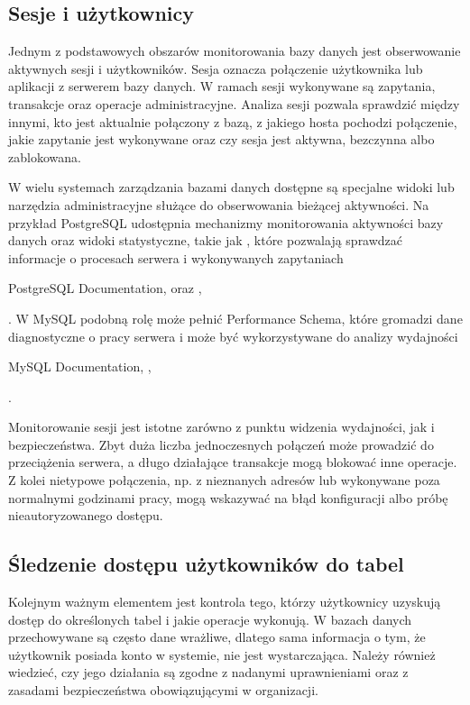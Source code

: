 \documentclass[letterpaper,10pt,polish]{sphinxmanual}
\begin{document}
\subsection{Sesje i użytkownicy}
\label{\detokenize{rozdzia_u0142_2/rozdzia_u0142_24/index:sesje-i-uzytkownicy}}
\sphinxAtStartPar
Jednym z podstawowych obszarów monitorowania bazy danych jest obserwowanie aktywnych sesji i użytkowników. Sesja oznacza połączenie użytkownika lub aplikacji z serwerem bazy danych. W ramach sesji wykonywane są zapytania, transakcje oraz operacje administracyjne. Analiza sesji pozwala sprawdzić między innymi, kto jest aktualnie połączony z bazą, z jakiego hosta pochodzi połączenie, jakie zapytanie jest wykonywane oraz czy sesja jest aktywna, bezczynna albo zablokowana.

\sphinxAtStartPar
W wielu systemach zarządzania bazami danych dostępne są specjalne widoki lub narzędzia administracyjne służące do obserwowania bieżącej aktywności. Na przykład PostgreSQL udostępnia mechanizmy monitorowania aktywności bazy danych oraz widoki statystyczne, takie jak , które pozwalają sprawdzać informacje o procesach serwera i wykonywanych zapytaniach %
\begin{footnote}[1]\sphinxAtStartFootnote
PostgreSQL Documentation,  oraz , 
%
\end{footnote}. W MySQL podobną rolę może pełnić Performance Schema, które gromadzi dane diagnostyczne o pracy serwera i może być wykorzystywane do analizy wydajności %
\begin{footnote}[2]\sphinxAtStartFootnote
MySQL Documentation, , 
%
\end{footnote}.

\sphinxAtStartPar
Monitorowanie sesji jest istotne zarówno z punktu widzenia wydajności, jak i bezpieczeństwa. Zbyt duża liczba jednoczesnych połączeń może prowadzić do przeciążenia serwera, a długo działające transakcje mogą blokować inne operacje. Z kolei nietypowe połączenia, np. z nieznanych adresów lub wykonywane poza normalnymi godzinami pracy, mogą wskazywać na błąd konfiguracji albo próbę nieautoryzowanego dostępu.


\subsection{Śledzenie dostępu użytkowników do tabel}
\label{\detokenize{rozdzia_u0142_2/rozdzia_u0142_24/index:sledzenie-dostepu-uzytkownikow-do-tabel}}
\sphinxAtStartPar
Kolejnym ważnym elementem jest kontrola tego, którzy użytkownicy uzyskują dostęp do określonych tabel i jakie operacje wykonują. W bazach danych przechowywane są często dane wrażliwe, dlatego sama informacja o tym, że użytkownik posiada konto w systemie, nie jest wystarczająca. Należy również wiedzieć, czy jego działania są zgodne z nadanymi uprawnieniami oraz z zasadami bezpieczeństwa obowiązującymi w organizacji.
\end{document}
